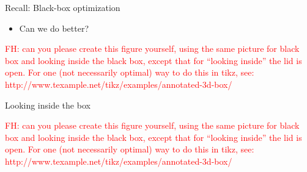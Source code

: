 \begin{frame}{Recall: Black-box optimization}
\begin{figure}
    \centering
    
\end{figure}
\pause
\begin{itemize}
    \item Can we do better?
\end{itemize}
    
    \textcolor{red}{FH: can you please create this figure yourself, using the same picture for black box and looking inside the black box, except that for ``looking inside'' the lid is open. For one (not necessarily optimal) way to do this in tikz, see: http://www.texample.net/tikz/examples/annotated-3d-box/}
    
\end{frame}
\begin{frame}{Looking inside the box}
\begin{figure}
    \centering
    
\end{figure}

    \textcolor{red}{FH: can you please create this figure yourself, using the same picture for black box and looking inside the black box, except that for ``looking inside'' the lid is open. For one (not necessarily optimal) way to do this in tikz, see: http://www.texample.net/tikz/examples/annotated-3d-box/}

\end{frame}


